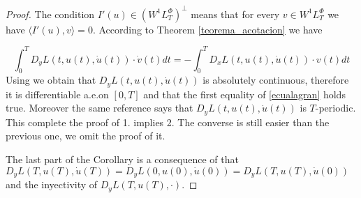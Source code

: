 \documentclass[twoside]{article}
\newcommand{\lphi}{L^{\Phi}}
\newcommand{\wphi}{W^{1}\lphi}
\begin{document}
\begin{proof} The condition $I'(u)\in\left( \wphi_T\right)^{\perp}$ means that for every $v\in \wphi_T$ we have $\langle I'(u),v\rangle=0$. According to Theorem
\ref{teorema_acotacion} we have

\[\int_0^TD_yL(t,u(t),\dot{u}(t))\cdot \dot{v}(t)dt=-\int_0^TD_xL(t,u(t),\dot{u}(t))\cdot v(t)dt \]
Using \cite[pag. 6]{mawhin2010critical} we obtain that $D_yL(t,u(t),\dot{u}(t))$ is absolutely continuous, therefore it is differentiable a.e.on $[0,T]$ and that the first equality of \ref{ecualagran} holds true. Moreover the same reference says that $D_yL(t,u(t),\dot{u}(t))$ is $T$-periodic. 
This complete the proof of 1. implies 2. The converse is still easier than the previous one, we omit the proof of it. 

The last part of the Corollary is a consequence of that $D_yL(T,u(T),\dot{u}(T))=D_yL(0,u(0),\dot{u}(0))=D_yL(T,u(T),\dot{u}(0))$ and the inyectivity of 
$D_yL(T,u(T),\cdot)$.

\end{proof}







\end{document}
